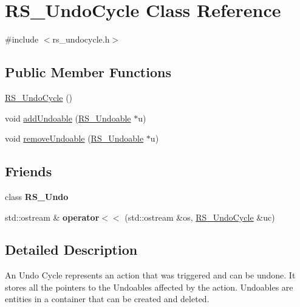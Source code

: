 \hypertarget{classRS__UndoCycle}{\section{R\-S\-\_\-\-Undo\-Cycle Class Reference}
\label{classRS__UndoCycle}
}


{\ttfamily \#include $<$rs\-\_\-undocycle.\-h$>$}

\subsection*{Public Member Functions}
\begin{DoxyCompactItemize}
\item 
\hyperlink{classRS__UndoCycle_a0ceb8ebeb0289cda2d24b0ca3980b122}{R\-S\-\_\-\-Undo\-Cycle} ()
\item 
void \hyperlink{classRS__UndoCycle_a1170db495b64f5ebb0e2d1ea5b2de335}{add\-Undoable} (\hyperlink{classRS__Undoable}{R\-S\-\_\-\-Undoable} $\ast$u)
\item 
void \hyperlink{classRS__UndoCycle_aa6d935f6508a380e92b3982f551a1194}{remove\-Undoable} (\hyperlink{classRS__Undoable}{R\-S\-\_\-\-Undoable} $\ast$u)
\end{DoxyCompactItemize}
\subsection*{Friends}
\begin{DoxyCompactItemize}
\item 
\hypertarget{classRS__UndoCycle_a1f51f791b37bc81c3ea77c6501f72afc}{class {\bfseries R\-S\-\_\-\-Undo}}\label{classRS__UndoCycle_a1f51f791b37bc81c3ea77c6501f72afc}

\item 
\hypertarget{classRS__UndoCycle_a28ec005fe07eec50d363218e285b1fa7}{std\-::ostream \& {\bfseries operator$<$$<$} (std\-::ostream \&os, \hyperlink{classRS__UndoCycle}{R\-S\-\_\-\-Undo\-Cycle} \&uc)}\label{classRS__UndoCycle_a28ec005fe07eec50d363218e285b1fa7}

\end{DoxyCompactItemize}


\subsection{Detailed Description}
An Undo Cycle represents an action that was triggered and can be undone. It stores all the pointers to the Undoables affected by the action. Undoables are entities in a container that can be created and deleted.

